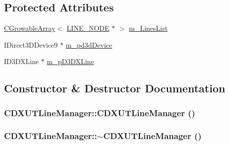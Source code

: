 \subsection*{Protected Attributes}
\begin{DoxyCompactItemize}
\item 
\hyperlink{class_c_growable_array}{CGrowableArray}$<$ \hyperlink{struct_c_d_x_u_t_line_manager_1_1_l_i_n_e___n_o_d_e}{LINE\_\-NODE} $\ast$ $>$ \hyperlink{class_c_d_x_u_t_line_manager_a529b6d8c2c733005bb6114809b70b58a}{m\_\-LinesList}
\item 
IDirect3DDevice9 $\ast$ \hyperlink{class_c_d_x_u_t_line_manager_a14112175096fd07b59058fed2a83ae6d}{m\_\-pd3dDevice}
\item 
ID3DXLine $\ast$ \hyperlink{class_c_d_x_u_t_line_manager_a34d87cec39b6a73c9f3dc3608859892a}{m\_\-pD3DXLine}
\end{DoxyCompactItemize}


\subsection{Constructor \& Destructor Documentation}
\hypertarget{class_c_d_x_u_t_line_manager_a81d134fec2bd2c9944bdea59b61d311b}{
\subsubsection[{CDXUTLineManager}]{\setlength{\rightskip}{0pt plus 5cm}CDXUTLineManager::CDXUTLineManager ()}}
\label{class_c_d_x_u_t_line_manager_a81d134fec2bd2c9944bdea59b61d311b}
\hypertarget{class_c_d_x_u_t_line_manager_a47573159d45aaf222cd31bcc192308fe}{
\subsubsection[{$\sim$CDXUTLineManager}]{\setlength{\rightskip}{0pt plus 5cm}CDXUTLineManager::$\sim$CDXUTLineManager ()}}
\label{class_c_d_x_u_t_line_manager_a47573159d45aaf222cd31bcc192308fe}


